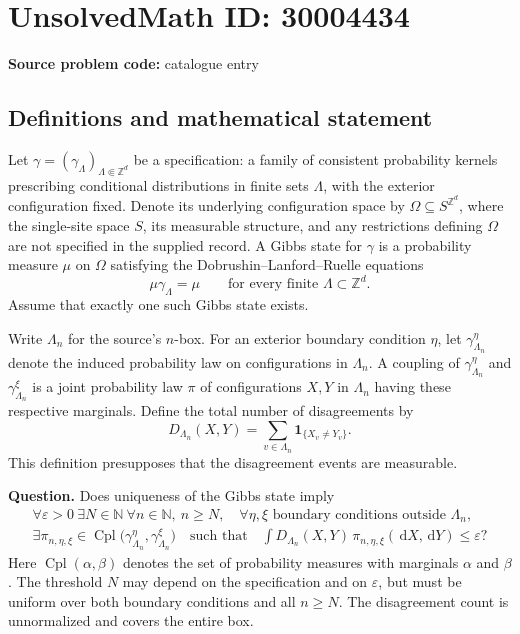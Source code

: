 \documentclass[11pt]{article}
\newcommand{\N}{\mathbb{N}}
\newcommand{\Z}{\mathbb{Z}}
\newcommand{\dd}{\,\mathrm{d}}
\begin{document}
\section*{UnsolvedMath ID: 30004434}
\textbf{Source problem code:} catalogue entry
\subsection{Definitions and mathematical statement}
Let \(\gamma=(\gamma_\Lambda)_{\Lambda\Subset\Z^d}\) be a specification: a family of consistent probability kernels prescribing conditional distributions in finite sets \(\Lambda\), with the exterior configuration fixed. Denote its underlying configuration space by \(\Omega\subseteq S^{\Z^d}\), where the single-site space \(S\), its measurable structure, and any restrictions defining \(\Omega\) are not specified in the supplied record. A Gibbs state for \(\gamma\) is a probability measure \(\mu\) on \(\Omega\) satisfying the Dobrushin--Lanford--Ruelle equations
\[
\mu\gamma_\Lambda=\mu\qquad\text{for every finite }\Lambda\subset\Z^d.
\]
Assume that exactly one such Gibbs state exists.

Write \(\Lambda_n\) for the source's \(n\)-box. For an exterior boundary condition \(\eta\), let \(\gamma_{\Lambda_n}^{\eta}\) denote the induced probability law on configurations in \(\Lambda_n\). A coupling of \(\gamma_{\Lambda_n}^{\eta}\) and \(\gamma_{\Lambda_n}^{\xi}\) is a joint probability law \(\pi\) of configurations \(X,Y\) in \(\Lambda_n\) having these respective marginals. Define the total number of disagreements by
\[
D_{\Lambda_n}(X,Y)=\sum_{v\in\Lambda_n}\mathbf{1}_{\{X_v\ne Y_v\}}.
\]
This definition presupposes that the disagreement events are measurable.

\textbf{Question.} Does uniqueness of the Gibbs state imply
\[
\begin{gathered}
\forall\varepsilon>0\ \exists N\in\N\ \forall n\in\N,\ n\ge N,\quad
\forall\eta,\xi\text{ boundary conditions outside }\Lambda_n,\\
\exists\pi_{n,\eta,\xi}\in
\operatorname{Cpl}\bigl(\gamma_{\Lambda_n}^{\eta},\gamma_{\Lambda_n}^{\xi}\bigr)
\quad\text{such that}\quad
\int D_{\Lambda_n}(X,Y)\,\pi_{n,\eta,\xi}(\dd X,\dd Y)
\le\varepsilon?
\end{gathered}
\]
Here \(\operatorname{Cpl}(\alpha,\beta)\) denotes the set of probability measures with marginals \(\alpha\) and \(\beta\). The threshold \(N\) may depend on the specification and on \(\varepsilon\), but must be uniform over both boundary conditions and all \(n\ge N\). The disagreement count is unnormalized and covers the entire box.
\end{document}
